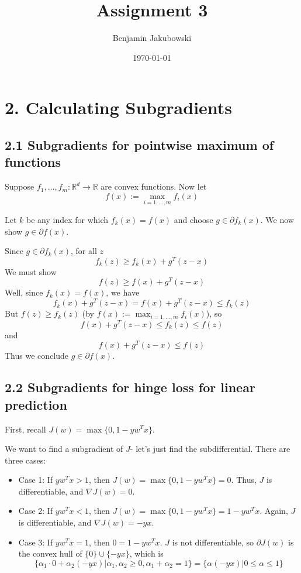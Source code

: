 \documentclass[paper=a4, fontsize=11pt]{scrartcl} %
\title{	Assignment 3}
\author{Benjamin Jakubowski} %
\date{\normalsize\today} %
\numberwithin{equation}{section} %
\numberwithin{figure}{section} %
\numberwithin{table}{section} %
\begin{document}
\maketitle %


\section*{2. Calculating Subgradients}
\subsection*{2.1 Subgradients for pointwise maximum of functions}

Suppose $f_1, \dots, f_m: \mathbb{R}^d \to \mathbb{R}$ are convex functions. Now let
\[f(x) := \max_{i = 1, \dots, m} f_i(x)\]

Let $k$ be any index for which $f_k(x) = f(x)$ and choose $g \in \partial f_k(x)$. We now show $g \in \partial f(x)$.

Since $g \in \partial f_k(x)$, for all $z$
\[f_k(z) \geq f_k(x) + g^T (z - x)\]
We must show
\[f(z) \geq f(x) + g^T (z - x)\]
Well, since $f_k(x) = f(x)$, we have
\[f_k(x) +g^T (z-x) = f(x) + g^T(z-x) \leq f_k(z)\]
But $f(z) \geq f_k(z)$ (by $f(x) := \max_{i = 1, \dots, m} f_i(x)$), so
\[f(x) + g^T (z - x) \leq f_k(z) \leq f(z)\]
and
\[f(x) + g^T(z - x) \leq f(z)\]
Thus we conclude $g \in \partial f(x)$.

\subsection*{2.2 Subgradients for hinge loss for linear prediction}

First, recall $J(w) = \max\{0, 1- yw^Tx\}$.

We want to find a subgradient of $J$- let's just find the subdifferential. There are three cases:
\begin{itemize}
\item Case 1: If $yw^Tx > 1$, then $J(w) =  \max\{0, 1- yw^Tx\} = 0$. Thus, $J$ is differentiable, and $\nabla J(w) = 0$.
\item Case 2: If $yw^Tx < 1$, then $J(w) =  \max\{0, 1- yw^Tx\} = 1- yw^Tx$. Again, $J$ is differentiable, and $\nabla J(w) = -yx$.
\item Case 3: If $yw^Tx = 1$, then $0 = 1- yw^Tx$. $J$ is not differentiable, so $\partial J(w)$ is the convex hull of $\{0\} \cup \{-yx\}$, which is
\[\{ \alpha_1 \cdot 0 + \alpha_2 (-yx) | \alpha_1, \alpha_2 \geq 0, \alpha_1 + \alpha_2 = 1\} = \{\alpha(-yx) | 0 \leq \alpha \leq 1\}\]
\end{itemize}
\end{document}
